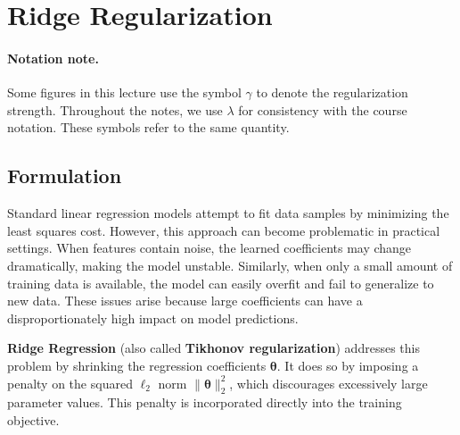 \documentclass{article}
\newcommand{\vecb}[1]{\boldsymbol{#1}} %
\begin{document}


\section{Ridge Regularization}

\paragraph{Notation note.}
Some figures in this lecture use the symbol $\gamma$ to denote the regularization strength.
Throughout the notes, we use $\lambda$ for consistency with the course notation.
These symbols refer to the same quantity.

\subsection{Formulation}

Standard linear regression models attempt to fit data samples by minimizing the least squares cost. However, this approach can become problematic in practical settings. When features contain noise, the learned coefficients may change dramatically, making the model unstable. Similarly, when only a small amount of training data is available, the model can easily overfit and fail to generalize to new data. These issues arise because large coefficients can have a disproportionately high impact on model predictions.

\textbf{Ridge Regression} (also called \textbf{Tikhonov regularization}) addresses this problem by shrinking the regression coefficients \(\vecb{\theta}\). It does so by imposing a penalty on the squared \(\ell_2\) norm \(\|\vecb{\theta}\|_2^2\), which discourages excessively large parameter values. This penalty is incorporated directly into the training objective.
\end{document}

